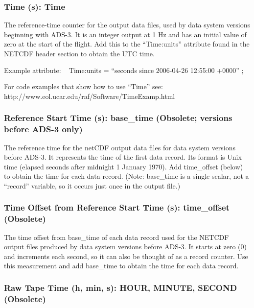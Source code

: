 \documentclass[
  english,
]{book}
\begin{document}
\hypertarget{time}{%
\subsubsection*{Time (s): Time}\label{time}}

The reference-time counter for the output data files, used by data system versions beginning with ADS-3. It is an integer output at 1 Hz and has an initial value of zero at the start of the flight. Add this to the ``Time:units'' attribute found in the NETCDF header section to obtain the UTC time.

Example attribute: ~
Time:units = ``seconds since 2006-04-26 12:55:00 +0000'' ;

For code examples that show how to use ``Time'' see:
http://www.eol.ucar.edu/raf/Software/TimeExamp.html

\hypertarget{base-time}{%
\subsubsection*{Reference Start Time (s): base\_time (Obsolete; versions before ADS-3 only)}\label{base-time}}

The reference time for the netCDF output data files for data system versions before ADS-3. It represents the time of the first data record. Its format is Unix time (elapsed seconds after midnight 1 January 1970). Add time\_offset (below) to obtain the time for each data record. (Note: base\_time is a single scalar, not a ``record'' variable, so it occurs just once in the output file.)

\hypertarget{time-offset}{%
\subsubsection*{Time Offset from Reference Start Time (s): time\_offset (Obsolete)}\label{time-offset}}

The time offset from base\_time of each data record used for the NETCDF output files produced by data system versions before ADS-3. It starts at zero (0) and increments each second, so it can also be thought of as a record counter. Use this measurement and add base\_time to obtain the time for each data record.

\hypertarget{hms}{%
\subsubsection*{Raw Tape Time (h, min, s): HOUR, MINUTE, SECOND (Obsolete)}\label{hms}}
\end{document}
